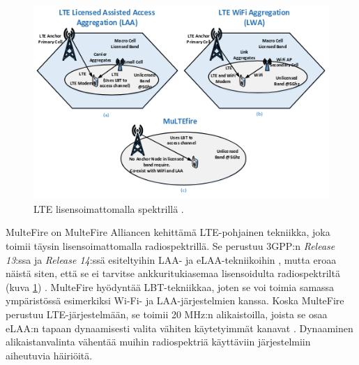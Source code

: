 \documentclass[finnish, 12pt, a4paper, elec, latin1, utf8, online]{aaltothesis}
\begin{document}
\begin{figure}[h!]
    \centering
    \includegraphics[scale=0.5]{Images/unlicensed.png}
    \caption{LTE lisensoimattomalla spektrillä \cite{ismaiel2017survey}.}
    \label{fig:unlicensed}
\end{figure}

MulteFire on MulteFire Alliancen kehittämä LTE-pohjainen tekniikka, joka toimii täysin lisensoimattomalla radiospektrillä. Se perustuu 3GPP:n \textit{Release 13}:ssa ja \textit{Release 14}:ssä esiteltyihin LAA- ja eLAA-tekniikoihin \cite{chambers2016multefire}, mutta eroaa näistä siten, että se ei tarvitse ankkuritukiasemaa lisensoidulta radiospektriltä (kuva \ref{fig:unlicensed}) \cite{ismaiel2017survey, multefire2015lte}. MulteFire hyödyntää LBT-tekniikkaa, joten se voi toimia samassa ympäristössä esimerkiksi Wi-Fi- ja LAA-järjestelmien kanssa. Koska MulteFire perustuu LTE-järjestelmään, se toimii 20 MHz:n alikaistoilla, joista se osaa eLAA:n tapaan dynaamisesti valita vähiten käytetyimmät kanavat \cite{chambers2016multefire}. Dynaaminen alikaistanvalinta vähentää muihin radiospektriä käyttäviin järjestelmiin aiheutuvia häiriöitä.
\end{document}
